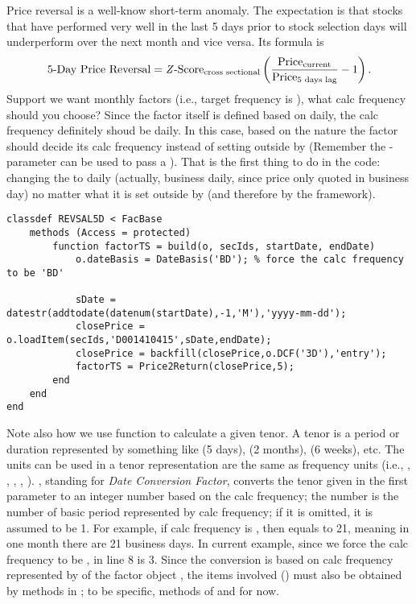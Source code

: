 \nopagebreak
{}
\begin{parchment}
\small\sffamily

Price reversal is a well-know short-term anomaly.  
The expectation is that stocks that have performed very well in the last 5 days prior to stock selection days 
will underperform over the next month and vice versa.
Its formula is 
\[
    \text{5-Day Price Reversal} = \text{\textit{Z}-Score}_{\text{cross sectional}}
       \left(\frac{\text{Price}_{\text{current}}}{\text{Price}_{\text{5 days lag}}}-1\right).
\]
Support we want monthly factors (i.e., target frequency is ),
what calc frequency should you choose?
Since the factor itself is defined based on daily,
the calc frequency definitely shoud be daily.
In this case, based on the nature
the factor should decide its calc frequency instead of
setting outside by  
(Remember the - parameter can be used
to pass a ).
That is the first thing to do in the code:
changing the  to daily
(actually, business daily, since price only quoted in business day)
no matter what it is set outside by  (and therefore by the framework).

\begin{lstlisting}
classdef REVSAL5D < FacBase
    methods (Access = protected)
        function factorTS = build(o, secIds, startDate, endDate)
            o.dateBasis = DateBasis('BD'); % force the calc frequency to be 'BD'
            
            sDate = datestr(addtodate(datenum(startDate),-1,'M'),'yyyy-mm-dd');
            closePrice = o.loadItem(secIds,'D001410415',sDate,endDate);
            closePrice = backfill(closePrice,o.DCF('3D'),'entry');
            factorTS = Price2Return(closePrice,5);
        end
    end
end
\end{lstlisting}

Note also how we use  function to calculate a given tenor.
A tenor is a period or duration represented by something like  (5 days),
 (2 months),  (6 weeks), etc.
The units can be used in a tenor representation are the same
as frequency units (i.e., , , , , ).
, standing for \emph{Date Conversion Factor},
converts the tenor given in the first parameter to an integer
number based on the calc frequency;
the number is the number of basic period represented by calc frequency;
if it is omitted, it is assumed to be 1.
For example, if calc frequency is ,
then  equals to 21, meaning in one month there are 21 business days.
In current example, since we force the calc frequency to be ,
 in line 8 is 3.
Since the conversion is based on calc frequency represented by 
of the factor object , the items involved ()
must also be obtained by methods in ;
to be specific, methods of  and  for now.


\end{parchment}
